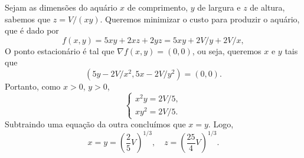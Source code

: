 \begin{questions}
\setcounter{question}{4}
\begin{solution}
    Sejam as dimensões do aquário $x$ de comprimento, $y$ de largura e $z$ de altura, sabemos que $z = V/(xy)$. Queremos minimizar o custo para produzir o aquário, que é dado por
    \[
        f(x,y) = 5xy+2xz+2yz = 5xy+2V/y+2V/x,
    \]
    O ponto estacionário é tal que $\nabla f(x,y) = (0,0)$, ou seja, queremos $x$ e $y$ tais que \[(5y-2V/x^2,5x-2V/y^2) = (0,0).\] 
    Portanto, como $x>0$, $y>0$,
    \[
        \begin{cases}
            x^2 y = 2V/5, \\
            x y^2 = 2V/5.
        \end{cases}
    \]
    Subtraindo uma equação da outra concluímos que $x=y$. Logo,
    \[
        x = y = \left( \frac{2}{5} V \right)^{1/3}, \quad z = \left( \frac{25}{4} V \right)^{1/3}.
    \]
\end{solution}


\end{questions}
